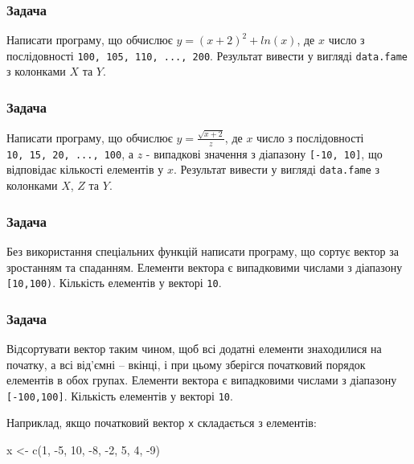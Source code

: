 \documentclass[
]{book}
\newenvironment{Shaded}{\begin{snugshade}}{\end{snugshade}}
\newcommand{\DecValTok}[1]{\textcolor[rgb]{0.00,0.00,0.81}{#1}}
\newcommand{\FunctionTok}[1]{\textcolor[rgb]{0.00,0.00,0.00}{#1}}
\newcommand{\NormalTok}[1]{#1}
\newcommand{\OtherTok}[1]{\textcolor[rgb]{0.56,0.35,0.01}{#1}}
\newcommand{\SpecialCharTok}[1]{\textcolor[rgb]{0.00,0.00,0.00}{#1}}
\begin{document}
\hypertarget{task6111}{%
\subsubsection{Задача}\label{task6111}}

Написати програму, що обчислює \(y = (x+2)^2 + ln(x)\), де \(x\) число з послідовності \texttt{100,\ 105,\ 110,\ ...,\ 200}. Результат вивести у вигляді \texttt{data.fame} з колонками \(X\) та \(Y\).

\hypertarget{task6112}{%
\subsubsection{Задача}\label{task6112}}

Написати програму, що обчислює \(y = \frac{\sqrt{x+2}}{z}\), де \(x\) число з послідовності \texttt{10,\ 15,\ 20,\ ...,\ 100}, а \(z\) - випадкові значення з діапазону \texttt{{[}-10,\ 10{]}}, що відповідає кількості елементів у \(x\). Результат вивести у вигляді \texttt{data.fame} з колонками \(X\), \(Z\) та \(Y\).

\hypertarget{task6113}{%
\subsubsection{Задача}\label{task6113}}

Без використання спеціальних функцій написати програму, що сортує вектор за зростанням та спаданням. Елементи вектора є випадковими числами з діапазону \texttt{{[}10,100)}. Кількість елементів у векторі \texttt{10}.

\hypertarget{task6114}{%
\subsubsection{Задача}\label{task6114}}

Відсортувати вектор таким чином, щоб всі додатні елементи знаходилися на початку, а всі від'ємні -- вкінці, і при цьому зберігся початковий порядок елементів в обох групах. Елементи вектора є випадковими числами з діапазону \texttt{{[}-100,100{]}}. Кількість елементів у векторі \texttt{10}.

Наприклад, якщо початковий вектор \texttt{x} складається з елементів:

\begin{Shaded}
\begin{Highlighting}[]
\NormalTok{x }\OtherTok{\textless{}{-}} \FunctionTok{c}\NormalTok{(}\DecValTok{1}\NormalTok{, }\SpecialCharTok{{-}}\DecValTok{5}\NormalTok{, }\DecValTok{10}\NormalTok{, }\SpecialCharTok{{-}}\DecValTok{8}\NormalTok{, }\SpecialCharTok{{-}}\DecValTok{2}\NormalTok{, }\DecValTok{5}\NormalTok{, }\DecValTok{4}\NormalTok{, }\SpecialCharTok{{-}}\DecValTok{9}\NormalTok{)}
\end{Highlighting}
\end{Shaded}
\end{document}
